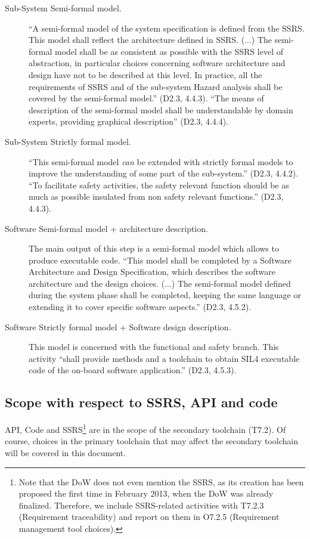 \begin{description}
  \item [Sub-System Semi-formal model.]  ``A semi-formal model of the system specification is defined from the SSRS. This model shall reflect the architecture defined in SSRS. (...) The semi-formal model shall be as consistent as possible with the SSRS level of abstraction, in particular choices concerning
software architecture and design have not to be described at this level. In practice, all the requirements of SSRS and of the sub-system Hazard analysis shall be covered by the semi-formal model.'' (D2.3, 4.4.3).  ``The means of description of the semi-formal model shall be understandable by domain experts, providing graphical description'' (D2.3, 4.4.4).

  \item [Sub-System Strictly formal model.] ``This semi-formal model \emph{can} be extended with strictly formal models to improve the understanding of some part of the sub-system.'' (D2.3, 4.4.2).  ``To facilitate safety activities, the safety relevant function should be as much as possible insulated from non safety relevant functions.'' (D2.3, 4.4.3).

  \item [Software Semi-formal model + architecture description.] The main output of this step is a semi-formal model which allows to produce executable code. ``This model shall be completed by a Software Architecture and Design Specification, which describes the software architecture and the design choices. (...) The semi-formal model defined during the system phase shall be completed, keeping the same language or extending it to cover specific software aspects.'' (D2.3, 4.5.2).

  \item [Software Strictly formal model + Software design description.]  This model is concerned with the functional and safety branch.  This activity ``shall provide methods and a toolchain to obtain SIL4 executable code of the on-board software application.'' (D2.3, 4.5.3).

\end{description}


\subsection{Scope with respect to SSRS, API and code}

API, Code and SSRS\footnote{Note that the DoW does not even mention the SSRS, as its creation has been proposed the first time in February 2013, when the DoW was already finalized.  Therefore, we include SSRS-related activities with T7.2.3 (Requirement traceability) and report on them in O7.2.5 (Requirement management tool choices).}  are in the scope of the secondary toolchain (T7.2).  Of course, choices in the primary toolchain that may affect the secondary toolchain will be covered in this document.

